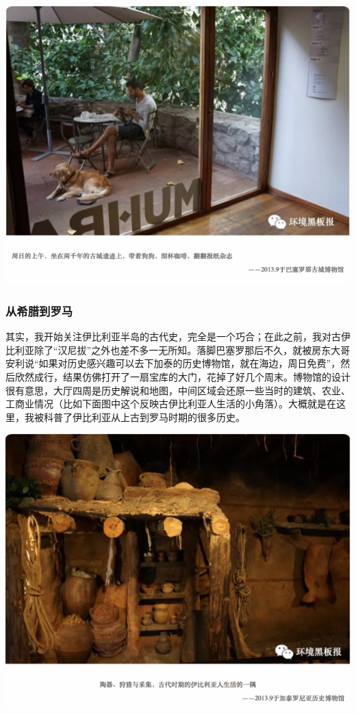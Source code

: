 \documentclass[
]{book}
\begin{document}
\includegraphics[width=8.33in]{images/xt9}

\hypertarget{ux4eceux5e0cux814aux5230ux7f57ux9a6c}{%
\subsubsection{从希腊到罗马}\label{ux4eceux5e0cux814aux5230ux7f57ux9a6c}}

其实，我开始关注伊比利亚半岛的古代史，完全是一个巧合；在此之前，我对古伊比利亚除了``汉尼拔''之外也差不多一无所知。落脚巴塞罗那后不久，就被房东大哥安利说``如果对历史感兴趣可以去下加泰的历史博物馆，就在海边，周日免费''，然后欣然成行，结果仿佛打开了一扇宝库的大门，花掉了好几个周末。博物馆的设计很有意思，大厅四周是历史解说和地图，中间区域会还原一些当时的建筑、农业、工商业情况（比如下面图中这个反映古伊比利亚人生活的小角落）。大概就是在这里，我被科普了伊比利亚从上古到罗马时期的很多历史。

\includegraphics[width=8.33in]{images/xt10}
\end{document}
